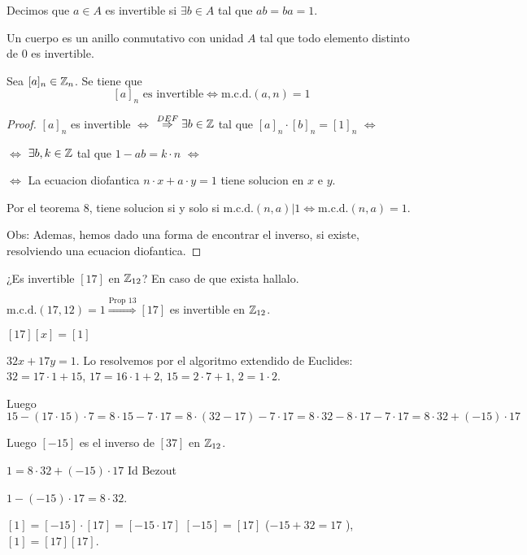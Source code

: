 \begin{definition}
	Decimos que \(a \in A\) es invertible si \(\exists  b \in A \) tal que \(ab = ba = 1 \).
\end{definition}
\begin{definition}
	Un cuerpo es un anillo conmutativo con unidad \(A \) tal que todo elemento distinto de \(0 \) es invertible.
\end{definition}

\begin{proposition}
	Sea \([a]_n \in \mathbb{Z}_n \). Se tiene que
	\[
		[a]_n \text{ es invertible} \iff  \mathrm{m.c.d.}(a,n) = 1
	\]
\end{proposition}
\begin{proof}
	\([a]_n \) es invertible \(\iff \) \(\overset{DEF}{\Rightarrow} \exists b \in \mathbb{Z} \) tal que \([a]_n \cdot [b]_n = [1]_n \) \(\iff \)
	
	\(\iff \)   \( \exists  b, k \in \mathbb{Z} \) tal que \(1 - ab = k \cdot n \) \(\iff \)
	
	\(\iff  \) La ecuacion diofantica \(n \cdot x + a \cdot y = 1 \) tiene solucion en \(x \) e \(y \).
	
	Por el teorema 8, tiene solucion si y solo si \(\mathrm{m.c.d.}(n,a)| 1 \iff  \mathrm{m.c.d.}(n,a) = 1 \).
	
	Obs: Ademas, hemos dado una forma de encontrar el inverso, si existe, resolviendo una ecuacion diofantica.
\end{proof}

\begin{example}
	¿Es invertible \([17 ]\) en \(\mathbb{Z}_{12 }\)? En caso de que exista hallalo.
	
	\(\mathrm{m.c.d.}(17,12) = 1 \overset{\text{Prop 13}}{\Rightarrow} [17] \) es invertible en \(\mathbb{Z}_{12 }\).
	
	\([17][x] = [1 ]\)
	
	\(32x + 17y = 1 \). Lo resolvemos por el algoritmo extendido de Euclides: \(32 = 17 \cdot 1 + 15 \), \(17 = 16 \cdot 1 + 2 \), \(15 = 2 \cdot 7 + 1 \), \(2 = 1 \cdot 2 \).
	
	Luego \(15 - (17 \cdot 15) \cdot 7 = 8 \cdot 15 - 7 \cdot 17 = 8 \cdot (32 - 17) - 7 \cdot 17 = 8 \cdot 32 - 8 \cdot 17 - 7 \cdot 17 = 8 \cdot 32 + (-15) \cdot 17 \)
	
	Luego \([-15 ]\) es el inverso de \([37]\) en \(\mathbb{Z}_{12 }\).
	
	\(1 = 8 \cdot 32 + (-15) \cdot 17 \) Id Bezout
	
	\(1 - (-15) \cdot 17 = 8 \cdot 32 \).
	
	\([1] = [-15] \cdot [17] = [-15 \cdot 17]\) \([-15] = [17]\) (\(-15 + 32 = 17\) ), \([1] = [17][17]\).
\end{example}

